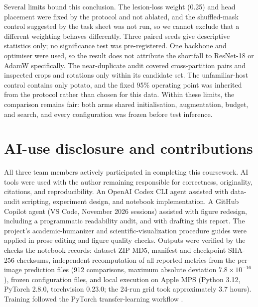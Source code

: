 \documentclass[10pt,a4paper]{article}
\begin{document}
Several limits bound this conclusion. The lesion-loss weight (0.25) and head placement were fixed by the
protocol and not ablated, and the shuffled-mask control suggested by the task sheet was not run, so we
cannot exclude that a different weighting behaves differently. Three paired seeds give descriptive
statistics only; no significance test was pre-registered. One backbone and optimiser were used, so the
result does not attribute the shortfall to ResNet-18 or AdamW specifically. The near-duplicate audit
covered cross-partition pairs and inspected crops and rotations only within its candidate set. The
unfamiliar-host control contains only potato, and the fixed 95\% operating point was inherited from the
protocol rather than chosen for this data. Within these limits, the comparison remains fair: both arms
shared initialisation, augmentation, budget, and search, and every configuration was frozen before test
inference.

\section{AI-use disclosure and contributions}
All three team members actively participated in completing this coursework.
AI tools were used with the author remaining responsible for correctness, originality, citations, and
reproducibility. An OpenAI Codex CLI agent assisted with data-audit scripting, experiment design, and
notebook implementation. A GitHub Copilot agent (VS Code, November 2026 sessions) assisted with figure
redesign, including a programmatic readability audit, and with drafting this report. The project's
academic-humanizer and scientific-visualization procedure guides were applied in prose editing and figure
quality checks. Outputs were verified by the checks the notebook records: dataset ZIP MD5, manifest and
checkpoint SHA-256 checksums, independent recomputation of all reported metrics from the per-image
prediction files (912 comparisons, maximum absolute deviation $7.8\times10^{-16}$), frozen configuration
files, and local execution on Apple MPS (Python 3.12, PyTorch 2.8.0, torchvision 0.23.0; the 24-run grid
took approximately 3.7 hours). Training followed the PyTorch transfer-learning workflow
\citep{chilamkurthy2025transfer}.


{\footnotesize}
\end{document}
